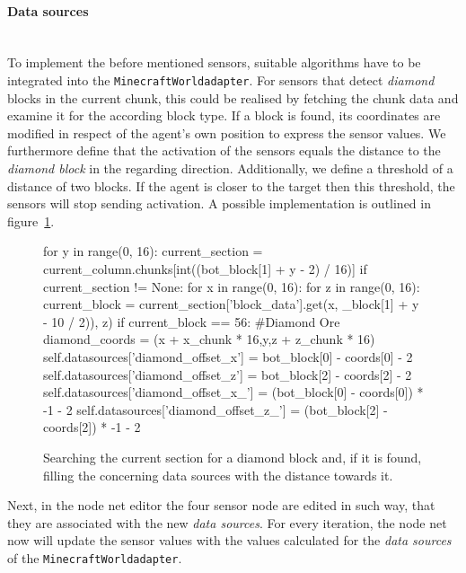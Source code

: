 \paragraph{Data sources}$\;$ \\

To implement the before mentioned sensors, suitable algorithms have to be integrated into the \texttt{MinecraftWorldadapter}. For sensors that detect \emph{diamond} blocks in the current chunk, this could be realised by fetching the chunk data and examine it for the according block type. If a block is found, its coordinates are modified in respect of the agent's own position to express the sensor values. We furthermore define that the activation of the sensors equals the distance to the \emph{diamond block} in the regarding direction. Additionally, we define a threshold of a distance of two blocks. If the agent is closer to the target then this threshold, the sensors will stop sending activation. A possible implementation is outlined in figure~\ref{listing_sensors}. 

		\begin{figure}[ht]
			\centering
			\begin{minipage}{17cm}
				\begin{pseudocode}
for y in range(0, 16):
 current_section = current_column.chunks[int((bot_block[1] + y -  2) / 16)]
 if current_section != None:
  for x in range(0, 16):
   for z in range(0, 16):
    current_block = current_section['block_data'].get(x, _block[1] + y - 10 / 2)), z)
    if current_block == 56: #Diamond Ore
     diamond_coords = (x + x_chunk * 16,y,z + z_chunk * 16)
     self.datasources['diamond_offset_x'] = bot_block[0] - coords[0] - 2
     self.datasources['diamond_offset_z'] = bot_block[2] - coords[2] - 2
     self.datasources['diamond_offset_x_'] = (bot_block[0] - coords[0]) * -1 - 2
     self.datasources['diamond_offset_z_'] = (bot_block[2] - coords[2]) * -1 - 2
			\end{pseudocode}
		\caption{Searching the current section for a diamond block and, if it is found, filling the concerning data sources with the distance towards it.}
		\label{listing_sensors}
	\end{minipage}
\end{figure}

Next, in the node net editor the four sensor node are edited in such way, that they are associated with the new \emph{data sources}. For every iteration, the node net now will update the sensor values with the values calculated for the \emph{data sources} of the \texttt{MinecraftWorldadapter}.

